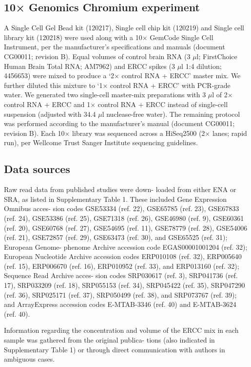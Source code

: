 \subsection{10× Genomics Chromium experiment}

A Single Cell Gel Bead kit (120217), Single cell chip kit (120219) and Single cell library kit (120218) were used along with a 10× GemCode Single Cell Instrument, per the manufacturer’s specifications and manuals (document CG00011; revision B). Equal volumes of control brain RNA (3 \( \mu \)l; FirstChoice Human Brain Total RNA; AM7962) and ERCC spikes (3 \( \mu \)l 1:4 dilution; 4456653) were mixed to produce a ‘2× control RNA + ERCC’ master mix. We further diluted this mixture to ‘1× control RNA + ERCC’ with PCR-grade water. We generated two single-cell master-mix preparations with 3 \( \mu \)l of 2× control RNA + ERCC and 1× control RNA + ERCC instead of single-cell suspension (adjusted with 34.4 \( \mu \)l nuclease-free water). The remaining protocol was performed according to the manufacturer’s manual (document CG00011; revision B). Each 10× library was sequenced across a HiSeq2500 (2× lanes; rapid run), per Wellcome Trust Sanger Institute sequencing guidelines.


\subsection{Data sources}

Raw read data from published studies were down- loaded from either ENA or SRA, as listed in Supplementary Table 1. These included Gene Expression Omnibus acces- sion codes GSE53334 (ref. 22), GSE65785 (ref. 23), GSE67833 (ref. 24), GSE53386 (ref. 25), GSE71318 (ref. 26), GSE46980 (ref. 9), GSE60361 (ref. 20), GSE60768 (ref. 27), GSE54695 (ref. 11), GSE78779 (ref. 28), GSE54006 (ref. 21), GSE72857 (ref. 29), GSE63473 (ref. 30), and GSE65525 (ref. 31); European Genome- phenome Archive accession code EGAS00001001204 (ref. 32); European Nucleotide Archive accession codes ERP010108 (ref. 32), ERP005640 (ref. 15), ERP006670 (ref. 16), ERP010952 (ref. 33), and ERP013160 (ref. 32); Sequence Read Archive acces- sion codes SRP030617 (ref. 3), SRP041736 (ref. 17), SRP033209 (ref. 18), SRP055153 (ref. 34), SRP045422 (ref. 35), SRP047290 (ref. 36), SRP025171 (ref. 37), SRP050499 (ref. 38), and SRP073767 (ref. 39); and ArrayExpress accession codes E-MTAB-3346 (ref. 40) and E-MTAB-3624 (ref. 40).

Information regarding the concentration and volume of the ERCC mix in each sample was gathered from the original publica- tions (also indicated in Supplementary Table 1) or through direct communication with authors in ambiguous cases.

